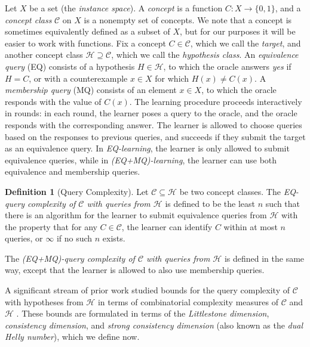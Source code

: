 \documentclass[11pt,a4paper]{amsart}
\theoremstyle{definition}
\newtheorem{definition}{Definition}
\newcommand{\mc}{\mathcal}
\begin{document}
Let $X$ be a set (the \emph{instance space}). 
A \emph{concept} is a function $C : X \to \{0,1\}$, and a \emph{concept class} $\mc C$ on $X$ is a nonempty set of concepts. 
We note that a concept is sometimes equivalently defined as a subset of $X$, but for our purposes it will be easier to work with functions. 
Fix a concept $C \in \mc C$, which we call the \textit{target}, and another concept class $\mc H \supseteq \mc C$, which we call the \emph{hypothesis class}. 
An \emph{equivalence query} (EQ) consists of a hypothesis $H \in \mc H$, to which the oracle answers \textit{yes} if $H = C$, or with a counterexample $x \in X$ for which $H(x) \neq C(x)$. 
A \emph{membership query} (MQ) consists of an element $x \in X$, to which the oracle responds with the value of $C(x)$. 
The learning procedure proceeds interactively in rounds: in each round, the learner poses a query to the oracle, and the oracle responds with the corresponding answer. 
The learner is allowed to choose queries based on the responses to previous queries, and succeeds if they submit the target as an equivalence query. 
In \emph{EQ-learning}, the learner is only allowed to submit equivalence queries, while in \emph{(EQ+MQ)-learning}, the learner can use both equivalence and membership queries. 

\begin{definition}[Query Complexity]
    Let $\mc C \subseteq \mc H$ be two concept classes. 
    The \emph{EQ-query complexity of $\mc C$ with queries from $\mc H$} is defined to be the least $n$ such that there is an algorithm for the learner to submit equivalence queries from $\mc H$ with the property that for any $C \in \mc C$, the learner can identify $C$ within at most $n$ queries, or $\infty$ if no such $n$ exists.
    
    The \emph{(EQ+MQ)-query complexity of $\mc C$ with queries from $\mc H$} is defined in the same way, except that the learner is allowed to also use membership queries.
\end{definition}

A significant stream of prior work studied bounds for the query complexity of $\mc C$ with hypotheses from $\mc H$ in terms of combinatorial complexity measures of $\mc C$ and $\mc H$ \cite{hellerstein-pillaipakkamnatt-raghavan-wilkins:how-many-queries-are-needed-to-learn,balcazar-castro-guijarro-simon:consistency-dimension-query-learning,chase-freitag:bounds-in-query-learning,hanneke-livni-moran:online-learning-simple-predictors}.
These bounds are formulated in terms of the \emph{Littlestone dimension}, \emph{consistency dimension}, and \emph{strong consistency dimension} (also known as the \emph{dual Helly number}), which we define now.
\end{document}
